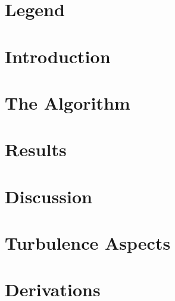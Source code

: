 


\frontmatter
%


\tableofcontents %
\chapter{Legend}
\newpage

\FloatBarrier

\mainmatter
\chapter{Introduction}

\chapter{The Algorithm}


\chapter{Results}

\chapter{Discussion}

\FloatBarrier

\appendix
\begin{small}
\begin{appendices}
\chapter{Turbulence Aspects}

%
\chapter{Derivations}

\end{appendices}
\end{small}
\FloatBarrier


